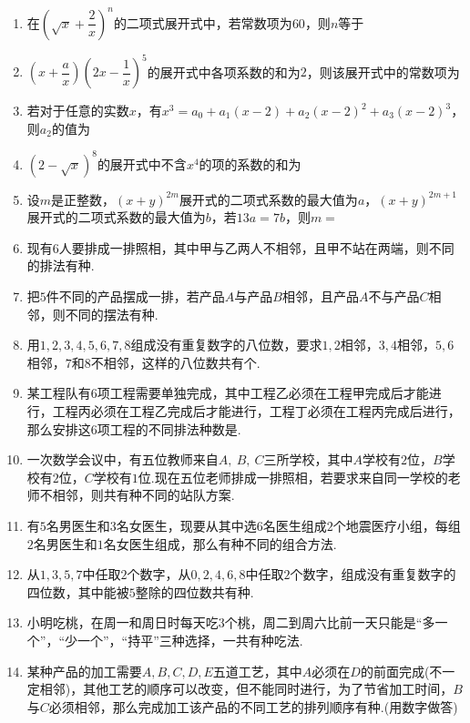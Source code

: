 \documentclass{BHCexam}
\begin{document}
\begin{enumerate}[1.]
\item 在$ \left(\sqrt{x}+\dfrac{2}{x}\right)^n $的二项式展开式中，若常数项为$ 60 $，则$ n $等于\xx
{}
\item $ \left(x+\dfrac{a}{x}\right)\left(2x-\dfrac{1}{x}\right)^5 $的展开式中各项系数的和为$ 2 $，则该展开式中的常数项为\xx
{}


\item 若对于任意的实数$ x $，有$ x^3=a_0+a_1(x-2)+a_2(x-2)^2+a_3(x-2)^3 $，则$ a_2 $的值为\xx
{}
\item $ \left(2-\sqrt{x}\right)^8 $的展开式中不含$ x^4 $的项的系数的和为\xx
{}
\item 设$ m $是正整数，$ (x+y)^{2m} $展开式的二项式系数的最大值为$ a $，$ (x+y)^{2m+1} $展开式的二项式系数的最大值为$ b $，若$ 13a=7b $，则$ m =$\xx
{}


\item 现有$ 6 $人要排成一排照相，其中甲与乙两人不相邻，且甲不站在两端，则不同的排法有\tk 种.
\item 把$ 5 $件不同的产品摆成一排，若产品$ A $与产品$ B $相邻，且产品$ A $不与产品$ C $相邻，则不同的摆法有\tk 种.
\item 用$ 1,2,3,4,5,6,7,8 $组成没有重复数字的八位数，要求$ 1,2 $相邻，$ 3,4 $相邻，$ 5,6 $相邻，$ 7\text{和}8 $不相邻，这样的八位数共有\tk 个.

\item 某工程队有$ 6 $项工程需要单独完成，其中工程乙必须在工程甲完成后才能进行，工程丙必须在工程乙完成后才能进行，工程丁必须在工程丙完成后进行，那么安排这$ 6 $项工程的不同排法种数是\tk.
\item 一次数学会议中，有五位教师来自$ A,~B,~C $三所学校，其中$ A $学校有$2$位，$ B $学校有$ 2 $位，$ C $学校有$ 1 $位.现在五位老师排成一排照相，若要求来自同一学校的老师不相邻，则共有\tk 种不同的站队方案.
\item 有$ 5 $名男医生和$ 3 $名女医生，现要从其中选$ 6 $名医生组成$ 2 $个地震医疗小组，每组$ 2 $名男医生和$ 1 $名女医生组成，那么有\tk 种不同的组合方法.
\item 从$ 1,3,5,7 $中任取$ 2 $个数字，从$ 0,2,4,6,8$中任取$ 2 $个数字，组成没有重复数字的四位数，其中能被$ 5 $整除的四位数共有\tk 种.
\item 小明吃桃，在周一和周日时每天吃$3$个桃，周二到周六比前一天只能是“多一个”，“少一个”，“持平”三种选择，一共有\tk 种吃法.
\item 某种产品的加工需要$ A,B,C,D,E $五道工艺，其中$ A $必须在$ D $的前面完成(不一定相邻)，其他工艺的顺序可以改变，但不能同时进行，为了节省加工时间，$ B $与$ C $必须相邻，那么完成加工该产品的不同工艺的排列顺序有\tk 种.(用数字做答)


\end{enumerate}
\end{document}
